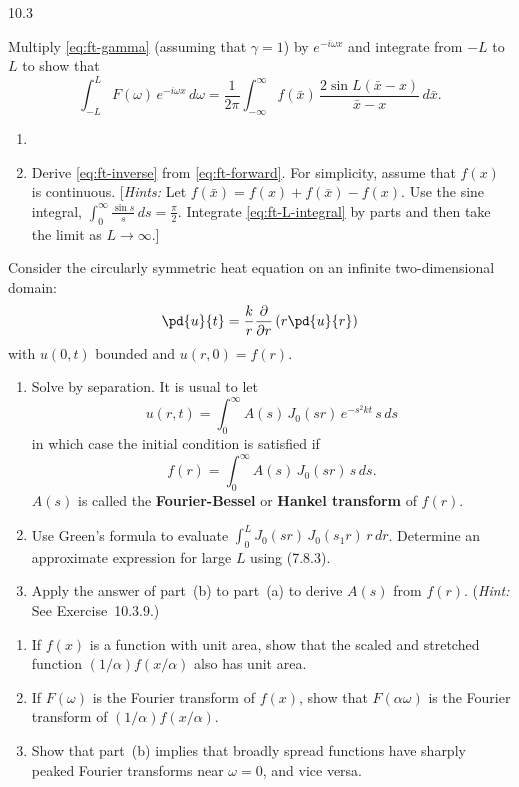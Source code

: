 \begin{exercises}{10.3}
\item Multiply \eqref{eq:ft-gamma} (assuming that $\gamma = 1$) by $e^{-i\omega x}$ and integrate from $-L$ to $L$ to show that
\begin{equation}
\label{eq:ft-L-integral}
\int_{-L}^{L} F(\omega)\,e^{-i\omega x}\,d\omega = \frac{1}{2\pi}\int_{-\infty}^{\infty} f(\bar{x})\,\frac{2\sin L(\bar{x}-x)}{\bar{x}-x}\,d\bar{x}.
\end{equation}
\begin{enumerate}
\item[(a)] %
\item[(b)] Derive \eqref{eq:ft-inverse} from \eqref{eq:ft-forward}.  For simplicity, assume that $f(x)$ is continuous.  [\textit{Hints:} Let $f(\bar{x}) = f(x) + f(\bar{x}) - f(x)$.  Use the sine integral, $\int_0^{\infty}\frac{\sin s}{s}\,ds = \frac{\pi}{2}$.  Integrate \eqref{eq:ft-L-integral} by parts and then take the limit as $L \to \infty$.]
\end{enumerate}

\item[\starred 10.3.10.] Consider the circularly symmetric heat equation on an infinite two-dimensional domain:
\[
\pd{u}{t} = \frac{k}{r}\frac{\partial}{\partial r}\left(r\pd{u}{r}\right)
\]
with $u(0,t)$ bounded and $u(r,0) = f(r)$.
\begin{enumerate}
\item[(a)] Solve by separation.  It is usual to let
\[
u(r,t) = \int_0^{\infty} A(s)\,J_0(sr)\,e^{-s^2 kt}\,s\,ds
\]
in which case the initial condition is satisfied if
\[
f(r) = \int_0^{\infty} A(s)\,J_0(sr)\,s\,ds.
\]
$A(s)$ is called the \textbf{Fourier-Bessel} or \textbf{Hankel transform} of $f(r)$.
\item[(b)] Use Green's formula to evaluate $\int_0^L J_0(sr)\,J_0(s_1 r)\,r\,dr$.  Determine an approximate expression for large $L$ using (7.8.3).
\item[(c)] Apply the answer of part~(b) to part~(a) to derive $A(s)$ from $f(r)$.  (\textit{Hint:} See Exercise~10.3.9.)
\end{enumerate}

\item
\begin{enumerate}
\item[(a)] If $f(x)$ is a function with unit area, show that the scaled and stretched function $(1/\alpha)f(x/\alpha)$ also has unit area.
\item[(b)] If $F(\omega)$ is the Fourier transform of $f(x)$, show that $F(\alpha\omega)$ is the Fourier transform of $(1/\alpha)f(x/\alpha)$.
\item[(c)] Show that part~(b) implies that broadly spread functions have sharply peaked Fourier transforms near $\omega = 0$, and vice versa.
\end{enumerate}


\end{exercises}
